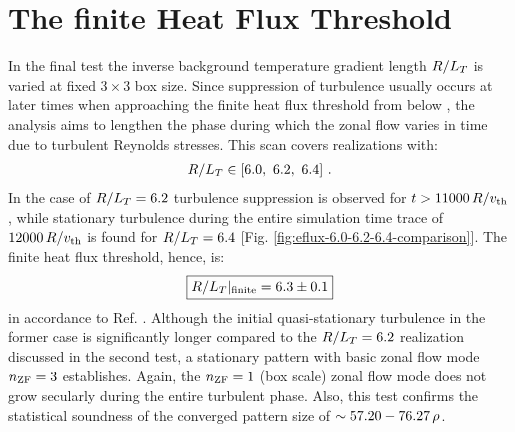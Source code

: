 
\newpage
\section{The finite Heat Flux Threshold}
\label{sec:threshold}

In the final test the inverse background temperature gradient length $R/L_T$ is varied at fixed $3\times3$ box size.
Since suppression of turbulence usually occurs at later times when approaching the finite heat flux threshold from below \cite{peeters2016}, the analysis aims to lengthen the phase during which the zonal flow varies in time due to turbulent Reynolds stresses.
This scan covers realizations with:
\begin{gather*}
	R/L_T \in [6.0,~6.2,~6.4]~.
\end{gather*}
In the case of $R/L_T = 6.2$ turbulence suppression is observed for $t > 11000\,R/v_{\mathrm{th}}$, while stationary turbulence during the entire simulation time trace of $12000\,R/v_{\mathrm{th}}$ is found for $R/L_T = 6.4$ [Fig. \ref{fig:eflux-6.0-6.2-6.4-comparison}].
The finite heat flux threshold, hence, is:
\begin{gather*}
	\boxed{R/L_T|_\mathrm{finite} = 6.3 \pm 0.1}
\end{gather*}
in accordance to Ref. .
Although the initial quasi-stationary turbulence in the former case is significantly longer compared to the $R/L_T = 6.2$ realization discussed in the second test, a stationary pattern with basic zonal flow mode $n_\mathrm{ZF} = 3$ establishes. 
Again, the $n_\mathrm{ZF} = 1$ (box scale) zonal flow mode does not grow secularly during the entire turbulent phase.
Also, this test confirms the statistical soundness of the converged pattern size of $\sim 57.20 - 76.27\,\rho$.

